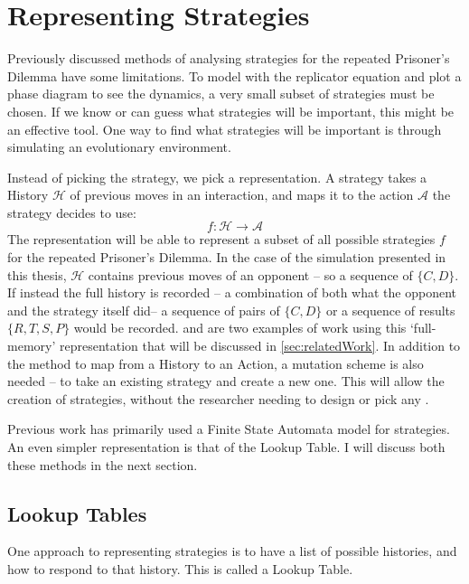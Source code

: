 \documentclass[a4paper,11pt,bcshonoursthesis,singlespace,oneside,thesisdraft,pdflatex]{cssethesis}
\begin{document}
\section{Representing Strategies}
Previously discussed methods of analysing strategies for the repeated Prisoner's Dilemma have some limitations. 
To model with the replicator equation and plot a phase diagram to see the dynamics, a very small subset of strategies must be chosen. 
If we know or can guess what strategies will be important, this might be an effective tool. 
One way to find what strategies will be important is through simulating an evolutionary environment. 

Instead of picking the strategy, we pick a representation. 
A strategy takes a History $\mathcal{H}$ of previous moves in an interaction, and maps it to the action $\mathcal{A}$ the strategy decides to use:
\begin{equation}
f: \mathcal{H} \rightarrow \mathcal{A}
\end{equation}
The representation will be able to represent a subset of all possible strategies $f$ for the repeated Prisoner's Dilemma. 
In the case of the simulation presented in this thesis, $\mathcal{H}$ contains previous moves of an opponent -- so a sequence of $\{C,D\}$. 
If instead the full history is recorded -- a combination of both what the opponent and the strategy itself did-- a sequence of pairs of $\{C,D\}$ or a sequence of results $\{R,T,S,P\}$ would be recorded. \citet{axelrod1987evolution} and \citet{fogel1993evolving} are two examples of work using this `full-memory' representation that will be discussed in \ref{sec:relatedWork}.
In addition to the method to map from a History to an Action, a mutation scheme is also needed -- to take an existing strategy and create a new one. 
This will allow the creation of strategies, without the researcher needing to design or pick any \citep{koza}. 

Previous work has primarily used a Finite State Automata model for strategies. 
An even simpler representation is that of the Lookup Table. 
I will discuss both these methods in the next section. 
\subsection{Lookup Tables}
\label{sec:mutation}
One approach to representing strategies is to have a list of possible histories, and how to respond to that history. This is called a Lookup Table. 
\end{document}
